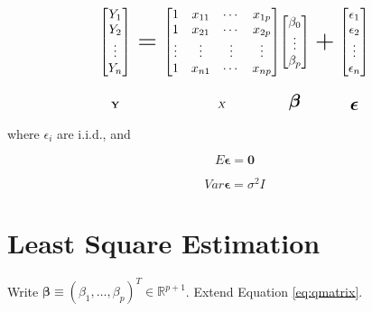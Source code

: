 \documentclass[]{book}
\theoremstyle{definition}
\theoremstyle{definition}
\theoremstyle{definition}
\theoremstyle{remark}
\begin{document}
\[
\underset{\substack{\\ \\ \\ \\ \huge \mathbf{Y}}}{\begin{bmatrix}
  Y_1 \\
  Y_2 \\
  \vdots \\
  Y_n
\end{bmatrix}} = \underset{\substack{\\ \\ \\ \\ \huge X}}{\begin{bmatrix}
  1 & x_{11} & \cdots & x_{1p} \\
  1 & x_{21} & \cdots & x_{2p} \\
  \vdots & \vdots & \vdots & \vdots \\
  1 & x_{n1} & \cdots & x_{np}
\end{bmatrix}} \underset{\substack{\\ \\ \\ \\ \huge \boldsymbol\beta}}{\begin{bmatrix}
  \beta_0 \\
  \vdots \\
  \beta_p
\end{bmatrix}} + \underset{\substack{\\ \\ \\ \\ \huge \boldsymbol\epsilon}}{\begin{bmatrix}
  \epsilon_1 \\
  \epsilon_2 \\
  \vdots \\
  \epsilon_n
\end{bmatrix}}
\]

where \(\epsilon_i\) are i.i.d., and

\[E\boldsymbol\epsilon = \mathbf{0}\]

\[Var\boldsymbol\epsilon = \sigma^2 I\]

\hypertarget{least-square-estimation}{%
\section{Least Square Estimation}\label{least-square-estimation}}

Write \(\boldsymbol\beta \equiv (\beta_1, \ldots, \beta_p)^T \in \mathbb{R}^{p + 1}\). Extend Equation \eqref{eq:qmatrix}.
\end{document}
